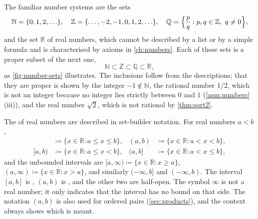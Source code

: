 The familiar number systems are the sets
\[
\mathbb N=\{0,1,2,\ldots\},\quad
\mathbb Z=\{\ldots,-2,-1,0,1,2,\ldots\},\quad
\mathbb Q=\Bigl\{\frac pq: p,q\in\mathbb Z,\ q\ne0\Bigr\},
\]
and the set $\mathbb R$ of real numbers, which cannot be described by a list or by a simple formula and is characterised by axioms in \cref{ch:numbers}. Each of these sets is a proper subset of the next one,
\[
\mathbb N\subset\mathbb Z\subset\mathbb Q\subset\mathbb R,
\]
as \cref{fig:number-sets} illustrates. The inclusions follow from the descriptions; that they are proper is shown by the integer $-1\notin\mathbb N$, the rational number $1/2$, which is not an integer because no integer lies strictly between $0$ and $1$ (\cref{asm:numbers}\,(iii)), and the real number $\sqrt2$, which is not rational by \cref{thm:sqrt2}.

\begin{figure}
\end{figure}

The  of real numbers are described in set-builder notation. For real numbers $a<b$,
\begin{align*}
[a,b]&\coloneqq\{x\in\mathbb R: a\le x\le b\}, &
(a,b)&\coloneqq\{x\in\mathbb R: a<x<b\},\\
[a,b)&\coloneqq\{x\in\mathbb R: a\le x<b\}, &
(a,b]&\coloneqq\{x\in\mathbb R: a<x\le b\},
\end{align*}
and the unbounded intervals are $[a,\infty)\coloneqq\{x\in\mathbb R: x\ge a\}$, $(a,\infty)\coloneqq\{x\in\mathbb R: x>a\}$, and similarly $(-\infty,b]$ and $(-\infty,b)$. The interval $[a,b]$ is , $(a,b)$ is , and the other two are half-open. The symbol $\infty$ is not a real number; it only indicates that the interval has no bound on that side. The notation $(a,b)$ is also used for ordered pairs (\cref{sec:products}), and the context always shows which is meant.

